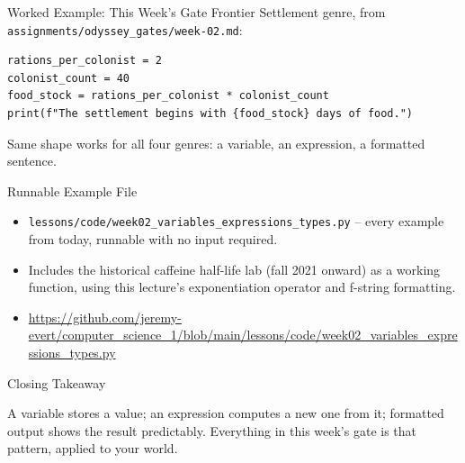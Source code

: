 \documentclass{beamer}
\begin{document}
\begin{frame}[fragile]{Worked Example: This Week's Gate}
Frontier Settlement genre, from \texttt{assignments/odyssey\_gates/week-02.md}:
\begin{verbatim}
rations_per_colonist = 2
colonist_count = 40
food_stock = rations_per_colonist * colonist_count
print(f"The settlement begins with {food_stock} days of food.")
\end{verbatim}
Same shape works for all four genres: a variable, an expression, a
formatted sentence.
\end{frame}

\begin{frame}{Runnable Example File}
\begin{itemize}
    \item \texttt{lessons/code/week02\_variables\_expressions\_types.py} -- every example from today, runnable with no input required.
    \item Includes the historical caffeine half-life lab (fall 2021 onward) as a working function, using this lecture's exponentiation operator and f-string formatting.
    \item \url{https://github.com/jeremy-evert/computer_science_1/blob/main/lessons/code/week02_variables_expressions_types.py}
\end{itemize}
\end{frame}

\begin{frame}{Closing Takeaway}
\begin{center}
\large
A variable stores a value; an expression computes a new one from it;
formatted output shows the result predictably. Everything in this week's
gate is that pattern, applied to your world.
\end{center}
\end{frame}
\end{document}
